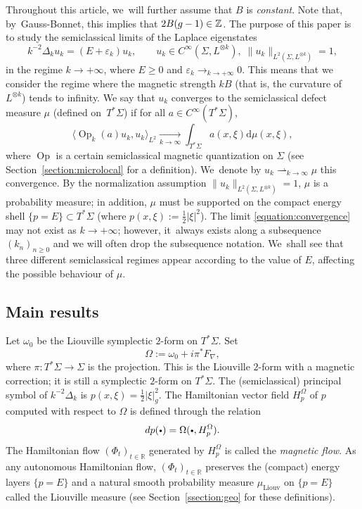 \documentclass[10pt,a4paper]{amsart}
\newcommand{\sbullet}{{\scriptscriptstyle\bullet}}
\newcommand{\csbullet}{{\raisebox{1pt}{$\sbullet$}}}
\theoremstyle{plain}
\theoremstyle{definition}
\newcommand{\R}{\mathbb{R}}
\newcommand{\Z}{\mathbb{Z}}
\let\eps\varepsilon
\newcommand{\dd}{\mathrm{d}}
\DeclareMathOperator{\Op}{Op}
\begin{document}
Throughout this article, we~will further assume that $B$ is \emph{constant}. Note that, by~Gauss-Bonnet, this implies that $2B(\textsl{g}-1) \in \Z$. The purpose of this paper is to study the semiclassical limits of the Laplace eigenstates
\begin{equation}
\label{equation:eigenstates}
k^{-2}\Delta_k u_k = (E+\eps_k)u_k, \qquad u_k \in C^\infty(\Sigma,L^{\otimes
k}), \; \|u_k\|_{L^2(\Sigma,L^{\otimes k})} = 1,
\end{equation}
in the regime $k \to +\infty$, where $E \geq 0$ and $\eps_k \to_{k \to +\infty} 0$. {\color{black}This means that we consider the regime where the magnetic strength $kB$ (that is, the curvature of $L^{\otimes k}$) tends to infinity.} We say that $u_k$ converges to the semiclassical defect measure $\mu$ (defined on~$T^*\Sigma$) if for all $a \in C^\infty(T^*\Sigma)$,
\begin{equation}
\label{equation:convergence}
\langle\Op_{k}(a)u_{k},u_{k}\rangle_{L^2} \underset{k \to \infty}\to \int_{T^*\Sigma} a(x,\xi) \dd\mu(x,\xi),
\end{equation}
where $\Op$ is a certain semiclassical magnetic quantization on $\Sigma$ (see Section~\ref{section:microlocal} for a definition). We~denote by $u_k \rightharpoonup_{k \to \infty} \mu$ this convergence. By the normalization assumption $\|u_k\|_{L^2(\Sigma,L^{\otimes k})} = 1$, $\mu$ is a probability measure; in addition, $\mu$ must be supported on the compact energy shell $\{p=E\} \subset T^*\Sigma$ (where $p(x,\xi) := \tfrac{1}{2}|\xi|^2$). The limit \eqref{equation:convergence} may not exist as $k \to +\infty$; however, it~always exists along a subsequence $(k_n)_{n \geq 0}$ and we will often drop the subsequence notation. We~shall see that three different semiclassical regimes appear according to the value of $E$, affecting the possible behaviour of $\mu$.

\subsection{Main results}

Let $\omega_0$ be the Liouville symplectic $2$-form on $T^*\Sigma$. Set
\[
\Omega := \omega_0 + i \pi^* F_\nabla,
\]
where $\pi : T^*\Sigma \to \Sigma$ is the projection. This is the Liouville $2$-form with a magnetic correction; it is still a symplectic $2$-form on $T^*\Sigma$. The (semiclassical) principal symbol of $k^{-2}\Delta_k$ is $p(x,\xi) = \tfrac{1}{2}|\xi|^2_g$. The Hamiltonian vector field $H_p^\Omega$ of $p$ computed with respect to $\Omega$ is defined through the relation
\[
dp(\csbullet) = \Omega(\csbullet, H^{\Omega}_p).
\]
The Hamiltonian flow $(\Phi_t)_{t \in \R}$ generated by $H_p^{\Omega}$ is called the \emph{magnetic flow}. As any autonomous Hamiltonian flow, $(\Phi_t)_{t \in \R}$ preserves the (compact) energy layers $\{p=E\}$ and a natural smooth probability measure $\mu_{\mathrm{Liouv}}$ on $\{p=E\}$ called the Liouville measure (see Section~\ref{ssection:geo} for these definitions).
\end{document}
